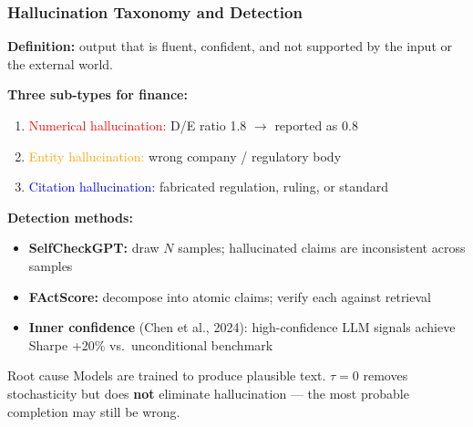 \documentclass[9pt,t]{beamer}
\begin{document}
\begin{frame}
\frametitle{Hallucination Taxonomy and Detection}

\textbf{Definition:} output that is fluent, confident, and not supported by the input
or the external world.

\medskip
\textbf{Three sub-types for finance:}
\begin{enumerate}
  \item \textcolor{red}{Numerical hallucination:} D/E ratio 1.8 $\to$ reported as 0.8
  \item \textcolor{orange}{Entity hallucination:} wrong company / regulatory body
  \item \textcolor{blue}{Citation hallucination:} fabricated regulation, ruling, or standard
\end{enumerate}

\medskip
\textbf{Detection methods:}
{\small
\begin{itemize}
  \item \textbf{SelfCheckGPT:} draw $N$ samples; hallucinated claims are inconsistent across samples
  \item \textbf{FActScore:} decompose into atomic claims; verify each against retrieval
  \item \textbf{Inner confidence} (Chen et al., 2024): high-confidence LLM signals
        achieve Sharpe +20\% vs.\ unconditional benchmark
\end{itemize}
}

\begin{block}{Root cause}
Models are trained to produce plausible text. $\tau = 0$ removes stochasticity
but does \textbf{not} eliminate hallucination --- the most probable completion may still be wrong.
\end{block}
\end{frame}
\end{document}
